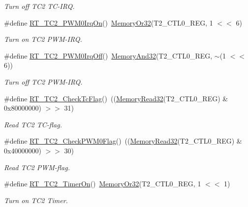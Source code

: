 \begin{DoxyCompactItemize}
\begin{DoxyCompactList}\small\item\em Turn off T\+C2 T\+C-\/\+I\+RQ. \end{DoxyCompactList}\item 
\#define \mbox{\hyperlink{a00047_a20ca153421087b763d5a1bcec1f90d55}{R\+T\+\_\+\+T\+C2\+\_\+\+P\+W\+M0\+Irq\+On}}()~\mbox{\hyperlink{a00020_a9ea92ebccdef6bdaca4d00210cc7266d}{Memory\+Or32}}(T2\+\_\+\+C\+T\+L0\+\_\+\+R\+EG, 1 $<$$<$ 6)
\begin{DoxyCompactList}\small\item\em Turn on T\+C2 P\+W\+M-\/\+I\+RQ. \end{DoxyCompactList}\item 
\#define \mbox{\hyperlink{a00047_aa5878518a5c2f7b419de8ed259b54e75}{R\+T\+\_\+\+T\+C2\+\_\+\+P\+W\+M0\+Irq\+Off}}()~\mbox{\hyperlink{a00020_a5c1a2bd4c1bd4c2f429d8042a45327ff}{Memory\+And32}}(T2\+\_\+\+C\+T\+L0\+\_\+\+R\+EG, $\sim$(1 $<$$<$ 6))
\begin{DoxyCompactList}\small\item\em Turn off T\+C2 P\+W\+M-\/\+I\+RQ. \end{DoxyCompactList}\item 
\#define \mbox{\hyperlink{a00047_ab9c273f7aaa4570b2a179b6711a50741}{R\+T\+\_\+\+T\+C2\+\_\+\+Check\+Tc\+Flag}}()~((\mbox{\hyperlink{a00020_a706b02571285f92589fbb0b964d7d0bb}{Memory\+Read32}}(T2\+\_\+\+C\+T\+L0\+\_\+\+R\+EG) \& 0x80000000) $>$$>$ 31)
\begin{DoxyCompactList}\small\item\em Read T\+C2 T\+C-\/flag. \end{DoxyCompactList}\item 
\#define \mbox{\hyperlink{a00047_a68bc636dca2736a8368cfd72ca9eb11a}{R\+T\+\_\+\+T\+C2\+\_\+\+Check\+P\+W\+M0\+Flag}}()~((\mbox{\hyperlink{a00020_a706b02571285f92589fbb0b964d7d0bb}{Memory\+Read32}}(T2\+\_\+\+C\+T\+L0\+\_\+\+R\+EG) \& 0x40000000) $>$$>$ 30)
\begin{DoxyCompactList}\small\item\em Read T\+C2 P\+W\+M-\/flag. \end{DoxyCompactList}\item 
\#define \mbox{\hyperlink{a00047_ab274ee44af2080d68745b2ec3af06648}{R\+T\+\_\+\+T\+C2\+\_\+\+Timer\+On}}()~\mbox{\hyperlink{a00020_a9ea92ebccdef6bdaca4d00210cc7266d}{Memory\+Or32}}(T2\+\_\+\+C\+T\+L0\+\_\+\+R\+EG, 1 $<$$<$ 1)
\begin{DoxyCompactList}\small\item\em Turn on T\+C2 Timer. \end{DoxyCompactList}\item 
$$
\end{DoxyCompactItemize}
